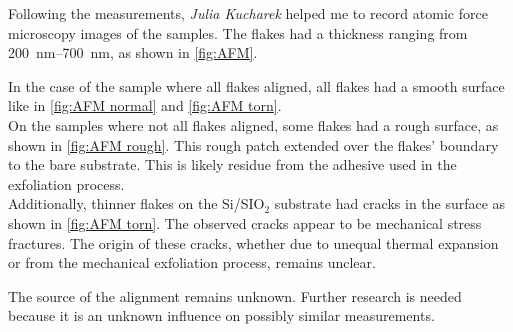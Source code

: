 \documentclass[
	oneside,
	parskip=half,
	a4paper,
]{scrbook}
\begin{document}
Following the measurements, \textit{Julia Kucharek} helped me to record atomic force microscopy images of the samples.
The flakes had a thickness ranging from \SIrange{200}{700}{nm}, as shown in \autoref{fig:AFM}.

In the case of the sample where all flakes aligned, all flakes had a smooth surface like in \autoref{fig:AFM normal} and \autoref{fig:AFM torn}.\\
On the samples where not all flakes aligned, some flakes had a rough surface, as shown in \autoref{fig:AFM rough}.
This rough patch extended over the flakes' boundary to the bare substrate.
This is likely residue from the adhesive used in the exfoliation process.\\
Additionally, thinner flakes on the Si/SIO$_2$ substrate had cracks in the surface as shown in \autoref{fig:AFM torn}.
The observed cracks appear to be mechanical stress fractures.
The origin of these cracks, whether due to unequal thermal expansion or from the mechanical exfoliation process, remains unclear. 

The source of the alignment remains unknown. 
Further research is needed because it is an unknown influence on possibly similar measurements.
\end{document}
